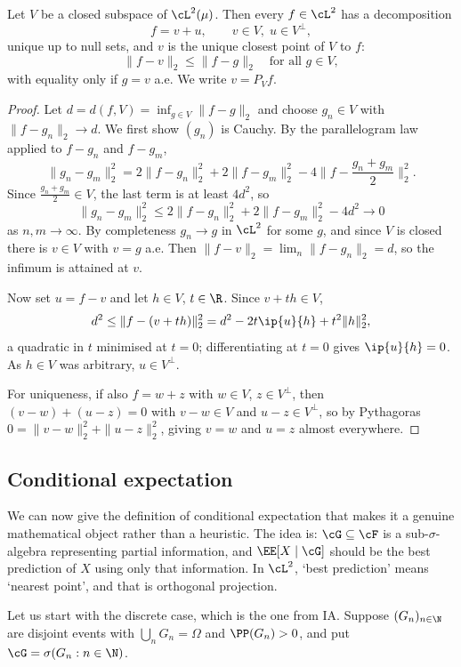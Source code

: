 \begin{theorem}\label{thm:projection}
	Let $V$ be a closed subspace of $\cL^2(\mu)$. Then every $f \in \cL^2$ has a decomposition
	$$
	f = v + u, \qquad v \in V, \; u \in V^\perp,
	$$
	unique up to null sets, and $v$ is the unique closest point of $V$ to $f$:
	$$
	\|f - v\|_2 \leq \|f-g\|_2 \quad \text{for all } g \in V,
	$$
	with equality only if $g = v$ a.e. We write $v = P_V f$.
\end{theorem}
\begin{proof}
	Let $d = d(f,V) = \inf_{g \in V}\|f-g\|_2$ and choose $g_n \in V$ with $\|f - g_n\|_2 \to d$. We first show $(g_n)$ is Cauchy. By the parallelogram law applied to $f - g_n$ and $f-g_m$,
	$$
	\|g_n - g_m\|_2^2 = 2\|f-g_n\|_2^2 + 2\|f-g_m\|_2^2 - 4\Big\| f - \frac{g_n+g_m}{2}\Big\|_2^2.
	$$
	Since $\frac{g_n+g_m}{2}\in V$, the last term is at least $4d^2$, so
	$$
	\|g_n-g_m\|_2^2 \leq 2\|f-g_n\|_2^2+2\|f-g_m\|_2^2 - 4d^2 \longrightarrow 0
	$$
	as $n,m\to\infty$. By completeness $g_n \to g$ in $\cL^2$ for some $g$, and since $V$ is closed there is $v \in V$ with $v = g$ a.e. Then $\|f-v\|_2 = \lim_n\|f-g_n\|_2 = d$, so the infimum is attained at $v$.

	Now set $u = f - v$ and let $h \in V$, $t\in\R$. Since $v + th\in V$,
	$$
	d^2 \leq \|f - (v+th)\|_2^2 = d^2 - 2t\ip{u}{h}+t^2\|h\|_2^2,
	$$
	a quadratic in $t$ minimised at $t=0$; differentiating at $t=0$ gives $\ip{u}{h}=0$. As $h \in V$ was arbitrary, $u \in V^\perp$.

	For uniqueness, if also $f = w+z$ with $w\in V$, $z\in V^\perp$, then $(v-w)+(u-z)=0$ with $v - w \in V$ and $u-z\in V^\perp$, so by Pythagoras $0 = \|v-w\|_2^2+\|u-z\|_2^2$, giving $v=w$ and $u=z$ almost everywhere.
\end{proof}

\subsection{Conditional expectation}

We can now give the definition of conditional expectation that makes it a genuine mathematical object rather than a heuristic. The idea is: $\cG \subseteq \cF$ is a sub-$\sigma$-algebra representing partial information, and $\EE[X\mid\cG]$ should be the best prediction of $X$ using only that information. In $\cL^2$, `best prediction' means `nearest point', and that is orthogonal projection.

Let us start with the discrete case, which is the one from IA. Suppose $(G_n)_{n\in\N}$ are disjoint events with $\bigcup_n G_n = \Omega$ and $\PP(G_n) > 0$, and put $\cG = \sigma(G_n : n \in \N)$.

